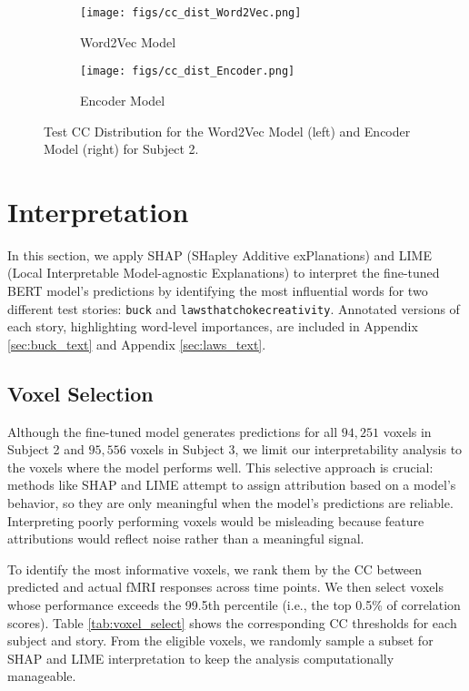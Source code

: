 \documentclass[10pt,letterpaper]{article}
\begin{document}
\begin{figure}[ht]
    \centering
    
    \begin{subfigure}[t]{0.4\textwidth}
        \centering
        \caption{Word2Vec Model}
        \texttt{[image: figs/cc\_dist\_Word2Vec.png]}
        \label{fig:cc_dist_Word2Vec}
    \end{subfigure}
    \hfill
    \begin{subfigure}[t]{0.4\textwidth}
        \centering
        \caption{Encoder Model}
        \texttt{[image: figs/cc\_dist\_Encoder.png]}
        \label{fig:cc_dist_Encoder}
    \end{subfigure}

    \caption{Test CC Distribution for the Word2Vec Model (left) and Encoder Model (right) for Subject 2.}
    \label{fig:cc_dist_Word2Vec_Encoder}
\end{figure}

\newpage

\section{Interpretation}

In this section, we apply SHAP (SHapley Additive exPlanations) and LIME (Local Interpretable Model-agnostic Explanations) to interpret the fine-tuned BERT model's predictions by identifying the most influential words for two different test stories: \texttt{buck} and \texttt{lawsthatchokecreativity}. Annotated versions of each story, highlighting word-level importances, are included in Appendix \ref{sec:buck_text} and Appendix \ref{sec:laws_text}.

\subsection{Voxel Selection}

Although the fine-tuned model generates predictions for all $94{,}251$ voxels in Subject 2 and $95{,}556$ voxels in Subject 3, we limit our interpretability analysis to the voxels where the model performs well. This selective approach is crucial: methods like SHAP and LIME attempt to assign attribution based on a model's behavior, so they are only meaningful when the model's predictions are reliable. Interpreting poorly performing voxels would be misleading because feature attributions would reflect noise rather than a meaningful signal.

To identify the most informative voxels, we rank them by the CC between predicted and actual fMRI responses across time points. We then select voxels whose performance exceeds the 99.5th percentile (i.e., the top 0.5\% of correlation scores). Table \ref{tab:voxel_select} shows the corresponding CC thresholds for each subject and story. From the eligible voxels, we randomly sample a subset for SHAP and LIME interpretation to keep the analysis computationally manageable.
\end{document}
